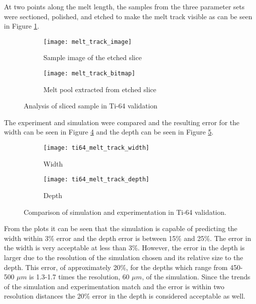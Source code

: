 At two points along the melt length, the samples from the three parameter sets were sectioned, polished, and etched to make the melt track visible as can be seen in Figure \ref{fig:melt_track_image}.  
\begin{figure}[!htb]
	\centering
		\begin{subfigure}{0.495\textwidth}
		\texttt{[image: melt\_track\_image]}
		\caption{Sample image of the etched slice}
		\label{fig:melt_track_image}
		\end{subfigure}
			\begin{subfigure}{0.495\textwidth}
			\texttt{[image: melt\_track\_bitmap]}
			\caption{Melt pool extracted from etched slice}
			\label{fig:melt_track_bitmap}
			\end{subfigure}
	\caption{Analysis of sliced sample in Ti-64 validation}
	\label{fig:melt_track}
\end{figure}

The experiment and simulation were compared and the resulting error for the width can be seen in Figure \ref{fig:ti64_melt_track_width} and the depth can be seen in Figure \ref{fig:ti64_melt_track_depth}.
\begin{figure}[!htb]\centering
	\begin{subfigure}[c]{0.45\textwidth}\centering
	\texttt{[image: ti64\_melt\_track\_width]}
	\caption{Width}
	\label{fig:ti64_melt_track_width}
	\end{subfigure}\hfill{}
		\begin{subfigure}[c]{0.45\textwidth}\centering
		\texttt{[image: ti64\_melt\_track\_depth]}
		\caption{Depth}
		\label{fig:ti64_melt_track_depth}
		\end{subfigure}
	\caption{Comparison of simulation and experimentation in Ti-64 validation.}
	\label{fig:ti64_melt_track}
\end{figure}
From the plots it can be seen that the simulation is capable of predicting the width within 3\% error and the depth error is between 15\% and 25\%.  The error in the width is very acceptable at less than 3\%.
However, the error in the depth is larger due to the resolution of the simulation chosen and its relative size to the depth.  This error, of approximately 20\%, for the depths which range from 450-500 $\mu m$ is 1.3-1.7 times the resolution, 60 $\mu m$, of the simulation.  Since the trends of the simulation and experimentation match and the error is within two resolution distances the 20\% error in the depth is considered acceptable as well. 
